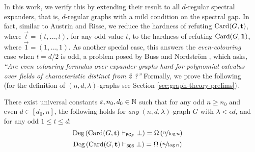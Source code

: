 \documentclass[11pt]{article}
\begin{document}
In this work, we verify this by extending their result to all $d$-regular spectral expanders, that is, $d$-regular graphs with a mild condition on the spectral gap.
In fact, similar to Austrin and Risse, we reduce the hardness of refuting $\text{Card}(G, \mathbf{t})$, where $\vec{t} = (t, \ldots, t)$, for any odd value $t$, to the hardness of refuting $\text{Card}(G, \mathbf{1})$, where $\vec{1} = (1, \ldots, 1)$.
As another special case, this answers the \emph{even-colouring} case when $t = d/2$ is odd, a problem posed by Buss and Nordstr\"{o}m \citep[Open Problem 7.7]{buss2021proof}, which asks, \textit{``Are even colouring formulas over expander graphs hard for polynomial calculus over fields of characteristic distinct from 2 ?''}
Formally, we prove the following (for the definition of $(n, d, \lambda)$-graphs see Section \ref{sec:graph-theory-prelims}).


\begin{theorem}\label{thm:general-hardness-result}

  There exist universal constants $\varepsilon, n_0, d_0 \in \mathbb{N}$ such that for any odd $n \ge n_0$ and even $d \in [d_0, n]$, the following holds for \emph{any} $(n, d, \lambda)$-graph $G$ with $\lambda < \epsilon d$, and for any odd $1 \leq t \leq d$:  
  \[ \text{Deg}\left(\text{Card}(G, \mathbf{t}) \vdash_{\texttt{PC}_F} \bot\right) = \Omega\left(\nicefrac{n}{\log n}\right)\]
  \[ \text{Deg}\left(\text{Card}(G, \mathbf{t}) \vdash_{\texttt{SOS}} \bot\right) = \Omega\left(\nicefrac{n}{\log n}\right)\]  
\end{theorem}
\end{document}
